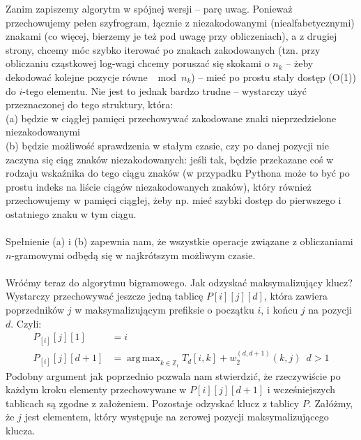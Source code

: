 \documentclass[a4paper]{article}
\DeclareMathOperator*{\argmax}{arg\,max}
\begin{document}
Zanim zapiszemy algorytm w spójnej wersji – parę uwag. Ponieważ przechowujemy pełen szyfrogram, łącznie z niezakodowanymi (niealfabetycznymi) znakami (co więcej, bierzemy je też pod uwagę przy obliczeniach), a z drugiej strony, chcemy móc szybko iterować po znakach zakodowanych (tzn. przy obliczaniu cząstkowej log-wagi chcemy poruszać się skokami o $n_k$ – żeby dekodować kolejne pozycje równe $\mod n_k$) – mieć po prostu stały dostęp (O(1)) do $i$-tego elementu. Nie jest to jednak bardzo trudne – wystarczy użyć przeznaczonej do tego struktury, która:\\
(a) będzie w ciągłej pamięci przechowywać zakodowane znaki nieprzedzielone niezakodowanymi\\
(b) będzie możliwość sprawdzenia w stałym czasie, czy po danej pozycji nie zaczyna się ciąg znaków niezakodowanych: jeśli tak, będzie przekazane coś w rodzaju wskaźnika do tego ciągu znaków (w przypadku Pythona może to być po prostu indeks na liście ciągów niezakodowanych znaków), który również przechowujemy w pamięci ciągłej, żeby np. mieć szybki dostęp do pierwszego i ostatniego znaku w tym ciągu.\\\\
Spełnienie (a) i (b) zapewnia nam, że wszystkie operacje związane z obliczaniami $n$-gramowymi odbędą się w najkrótszym możliwym czasie.\\\\
Wróćmy teraz do algorytmu bigramowego. Jak odzyskać maksymalizujący klucz? Wystarczy przechowywać jeszcze jedną tablicę $P[i][j][d]$, która zawiera poprzedników $j$ w maksymalizującym prefiksie o początku $i$, i końcu $j$ na pozycji $d$. Czyli:
\begin{align*}
P_[i][j][1] &= i \\
 P_[i][j][d+1] &= \argmax_{k \in \mathbb{Z}_l} T_{d}[i, k] + w_2^{(d,d+1)}(k, j)\,\,\, d > 1
\end{align*}
Podobny argument jak poprzednio pozwala nam stwierdzić, że rzeczywiście po każdym kroku elementy przechowywane w $P[i][j][d+1]$ i wcześniejszych tablicach są zgodne z założeniem. Pozostaje odzyskać klucz z tablicy $P$. Załóżmy, że $j$ jest elementem, który występuje na zerowej pozycji maksymalizującego klucza.\\\\
\begin{algorithm}[H]
\quad{}
\end{algorithm}
\end{document}
